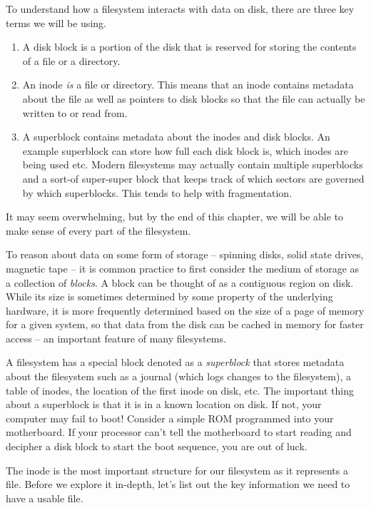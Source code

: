 To understand how a filesystem interacts with data on disk, there are three key terms we will be using.
\begin{enumerate}
  \item {} A disk block is a portion of the disk that is reserved for storing the contents of a file or a directory.
  \item {} An inode \emph{is} a file or directory.
    This means that an inode contains metadata about the file as well as pointers to disk blocks so that the file can actually be written to or read from.
  \item {} A superblock contains metadata about the inodes and disk blocks.
    An example superblock can store how full each disk block is, which inodes are being used etc.
    Modern filesystems may actually contain multiple superblocks and a sort-of super-super block that keeps track of which sectors are governed by which superblocks.
    This tends to help with fragmentation.
\end{enumerate}

It may seem overwhelming, but by the end of this chapter, we will be able to make sense of every part of the filesystem.

To reason about data on some form of storage -- spinning disks, solid state drives, magnetic tape -- it is common practice to first consider the medium of storage as a collection of \emph{blocks}.
A block can be thought of as a contiguous region on disk.
While its size is sometimes determined by some property of the underlying hardware, it is more frequently determined based on the size of a page of memory for a given system, so that data from the disk can be cached in memory for faster access -- an important feature of many filesystems.

A filesystem has a special block denoted as a \emph{superblock} that stores metadata about the filesystem such as a journal (which logs changes to the filesystem), a table of inodes, the location of the first inode on disk, etc.
The important thing about a superblock is that it is in a known location on disk.
If not, your computer may fail to boot!
Consider a simple ROM programmed into your motherboard.
If your processor can't tell the motherboard to start reading and decipher a disk block to start the boot sequence, you are out of luck.

The inode is the most important structure for our filesystem as it represents a file.
Before we explore it in-depth, let's list out the key information we need to have a usable file.

